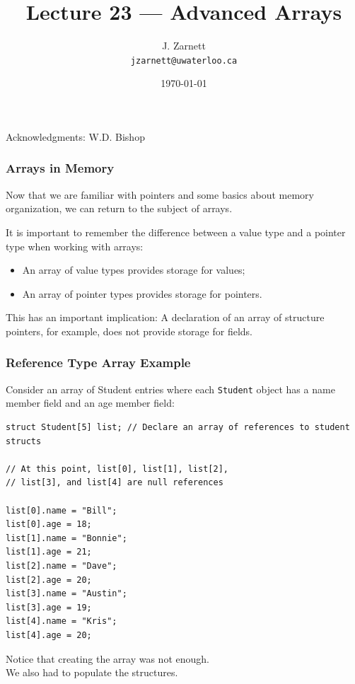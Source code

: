 

\title{Lecture 23 --- Advanced Arrays }

\author{J. Zarnett\\
\texttt{jzarnett@uwaterloo.ca}}
\date{\today}



\begin{frame}
  \titlepage
  
  \begin{center}
  \small{Acknowledgments: W.D. Bishop}
  \end{center}
\end{frame}


\begin{frame}
\frametitle{Arrays in Memory}
Now that we are familiar with pointers and some basics about memory organization, we can return to the subject of arrays.

It is important to remember the difference between a value type and a pointer type when working with arrays:\\
\begin{itemize}
	\item An array of value types provides storage for values;\\
	\item An array of pointer types provides storage for pointers.
\end{itemize}

This has an important implication:
A declaration of an array of structure pointers, for example, does not provide storage for fields.

\end{frame}

\begin{frame}[fragile]
\frametitle{Reference Type Array Example}

Consider an array of Student entries where each \texttt{Student} object has a name member field and an age member field:

{\scriptsize
\begin{verbatim}
struct Student[5] list;	// Declare an array of references to student structs
	
// At this point, list[0], list[1], list[2], 
// list[3], and list[4] are null references

list[0].name = "Bill";
list[0].age = 18;
list[1].name = "Bonnie";
list[1].age = 21;
list[2].name = "Dave";
list[2].age = 20;
list[3].name = "Austin";
list[3].age = 19;
list[4].name = "Kris";
list[4].age = 20;
\end{verbatim}
}
Notice that creating the array was not enough.\\
\quad We also had to populate the structures.

\end{frame}

